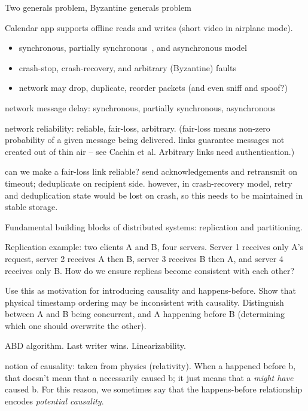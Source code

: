Two generals problem, Byzantine generals problem

Calendar app supports offline reads and writes (short video in airplane mode).

\begin{itemize}
\item synchronous, partially synchronous~\cite{Dwork:1988dr}, and asynchronous model
\item crash-stop, crash-recovery, and arbitrary (Byzantine) faults
\item network may drop, duplicate, reorder packets (and even sniff and spoof?)
\end{itemize}

network message delay: synchronous, partially synchronous, asynchronous

network reliability: reliable, fair-loss, arbitrary. (fair-loss means non-zero probability of a
given message being delivered. links guarantee messages not created out of thin air -- see Cachin et al.
Arbitrary links need authentication.)

can we make a fair-loss link reliable? send acknowledgements and retransmit on timeout; deduplicate
on recipient side. however, in crash-recovery model, retry and deduplication state would be lost on
crash, so this needs to be maintained in stable storage.

Fundamental building blocks of distributed systems: replication and partitioning.

Replication example: two clients A and B, four servers. Server 1 receives only A's request,
server 2 receives A then B, server 3 receives B then A, and server 4 receives only B.
How do we ensure replicas become consistent with each other?

Use this as motivation for introducing causality and happens-before.
Show that physical timestamp ordering may  be inconsistent with causality.
Distinguish between A and B being concurrent, and A happening before B
(determining which one should overwrite the other).

ABD algorithm. Last writer wins. Linearizability.

notion of causality: taken from physics (relativity).
When a happened before b, that doesn't mean that a necessarily caused b; it just means that a \emph{might have} caused b.
For this reason, we sometimes say that the happens-before relationship encodes \emph{potential causality}.

